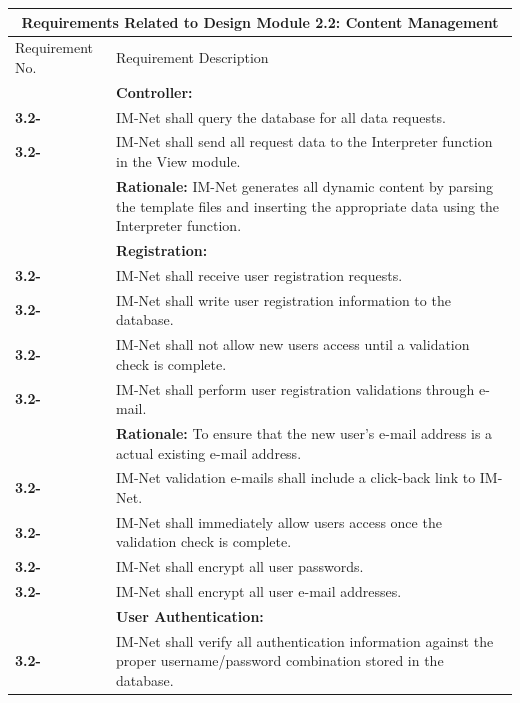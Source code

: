 \documentclass[letterpaper,12pt]{article}
\newcounter{rcounter}						%
\newcommand\rnumber{\stepcounter{rcounter}\arabic{rcounter}}
\begin{document}
{\begin{center}
\begin{tabular}{|l|p{6in}|}
\end{tabular} 
\end{center}

\setcounter{rcounter}{0}
\begin{center}
\begin{tabular}{|l|p{6in}|}
\hline 
\multicolumn{2}{|c|}{\textbf{Requirements Related to Design Module 2.2: Content Management}} \\ 
\hline 
Requirement No. & Requirement Description \\ 
\hline
& \textbf{Controller:} \\
\hline
\textbf{3.2-\rnumber} & IM-Net shall query the database for all data requests. \\ 
\hline 
\textbf{3.2-\rnumber} & IM-Net shall send all request data to the Interpreter function in the View module. \\
& \textbf{Rationale:} IM-Net generates all dynamic content by parsing the template files and inserting the appropriate data using the Interpreter function. \\
\hline 
& \textbf{Registration:} \\
\hline
\textbf{3.2-\rnumber} & IM-Net shall receive user registration requests. \\
\hline 
\textbf{3.2-\rnumber} & IM-Net shall write user registration information to the database. \\ 
\hline 
\textbf{3.2-\rnumber} & IM-Net shall not allow new users access until a validation check is complete. \\ 
\hline 
\textbf{3.2-\rnumber} & IM-Net shall perform user registration validations through e-mail. \\
& \textbf{Rationale:} To ensure that the new user's e-mail address is a actual existing e-mail address.\\
\hline 
\textbf{3.2-\rnumber} & IM-Net validation e-mails shall include a click-back link to IM-Net. \\ 
\hline 
\textbf{3.2-\rnumber} & IM-Net shall immediately allow users access once the validation check is complete. \\ 
\hline 
\textbf{3.2-\rnumber} & IM-Net shall encrypt all user passwords. \\ 
\hline 
\textbf{3.2-\rnumber} & IM-Net shall encrypt all user e-mail addresses. \\ 
\hline 
& \textbf{User Authentication:} \\
\hline
\textbf{3.2-\rnumber} & IM-Net shall verify all authentication information against the proper username/password combination stored in the database. \\ 

\end{tabular}
\end{center}}
\end{document}
